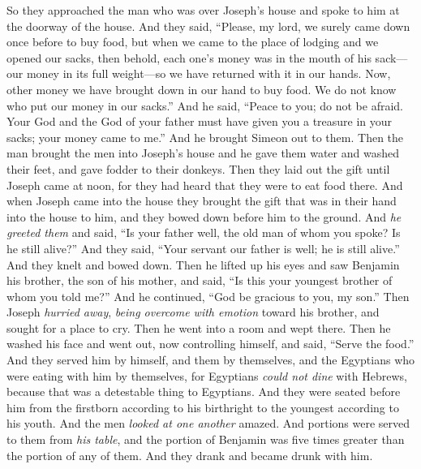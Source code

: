 \begin{biblechapter}
\verse So they approached the man who was over Joseph’s house and spoke to him at the doorway of the house.
\verse And they said, “Please, my lord, we surely came down once before to buy food,
\verse but when we came to the place of lodging and we opened our sacks, then behold, each one’s money was in the mouth of his sack—our money in its full weight—so we have returned with it in our hands.
\verse Now, other money we have brought down in our hand to buy food. We do not know who put our money in our sacks.”
\verse And he said, “Peace to you; do not be afraid. Your God and the God of your father must have given you a treasure in your sacks; your money came to me.” And he brought Simeon out to them.
\verse Then the man brought the men into Joseph’s house and he gave them water and washed their feet, and gave fodder to their donkeys.
\verse Then they laid out the gift until Joseph came at noon, for they had heard that they were to eat food there.
\verse And when Joseph came into the house they brought the gift that was in their hand into the house to him, and they bowed down before him to the ground.
\verse And \textit{he greeted them} and said, “Is your father well, the old man of whom you spoke? Is he still alive?”
\verse And they said, “Your servant our father is well; he is still alive.” And they knelt and bowed down.
\verse Then he lifted up his eyes and saw Benjamin his brother, the son of his mother, and said, “Is this your youngest brother of whom you told me?” And he continued, “God be gracious to you, my son.”
\verse Then Joseph \textit{hurried away}, \textit{being overcome with emotion} toward his brother, and sought for a place to cry. Then he went into a room and wept there.
\verse Then he washed his face and went out, now controlling himself, and said, “Serve the food.”
\verse And they served him by himself, and them by themselves, and the Egyptians who were eating with him by themselves, for Egyptians \textit{could not dine} with Hebrews, because that was a detestable thing to Egyptians.
\verse And they were seated before him from the firstborn according to his birthright to the youngest according to his youth. And the men \textit{looked at one another} amazed.
\verse And portions were served to them from \textit{his table}, and the portion of Benjamin was five times greater than the portion of any of them. And they drank and became drunk with him.
\end{biblechapter}


